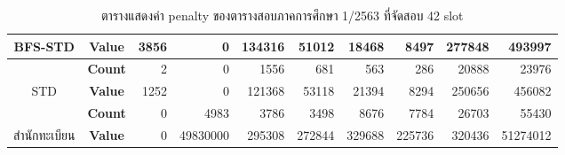 \begin{table}[]
{\begin{tabular}{@{}ccrrrrrrrr@{}}
    \multirow{-2}{*}{BFS-STD}                    & \textbf{Value}                        & 3856                        & 0                        & 134316                        & 51012                        & 18468                        & 8497                        & 277848                        & 493997                        \\ \midrule
    {\color[HTML]{FE0000} }                      & {\color[HTML]{FE0000} \textbf{Count}} & {\color[HTML]{FE0000} 2}    & {\color[HTML]{FE0000} 0} & {\color[HTML]{FE0000} 1556}   & {\color[HTML]{FE0000} 681}   & {\color[HTML]{FE0000} 563}   & {\color[HTML]{FE0000} 286}  & {\color[HTML]{FE0000} 20888}  & {\color[HTML]{FE0000} 23976}  \\ \cmidrule(l){2-10} 
    \multirow{-2}{*}{{\color[HTML]{FE0000} STD}} & {\color[HTML]{FE0000} \textbf{Value}} & {\color[HTML]{FE0000} 1252} & {\color[HTML]{FE0000} 0} & {\color[HTML]{FE0000} 121368} & {\color[HTML]{FE0000} 53118} & {\color[HTML]{FE0000} 21394} & {\color[HTML]{FE0000} 8294} & {\color[HTML]{FE0000} 250656} & {\color[HTML]{FE0000} 456082} \\ \midrule
                                                 & \textbf{Count}                        & 0                           & 4983                     & 3786                           & 3498                           & 8676                           & 7784                   & 26703                         & 55430                         \\ \cmidrule(l){2-10} 
    \multirow{-2}{*}{สำนักทะเบียน}                  & \textbf{Value}                        & 0                           & 49830000                 & 295308                         & 272844                         & 329688                         & 225736                 & 320436                        & 51274012                      \\ \bottomrule
    \end{tabular}%
    }
    \caption{ตารางแสดงค่า penalty ของตารางสอบภาคการศึกษา 1/2563 ที่จัดสอบ 42 slot}
    \label{tab:result_table_163}
\end{table}
